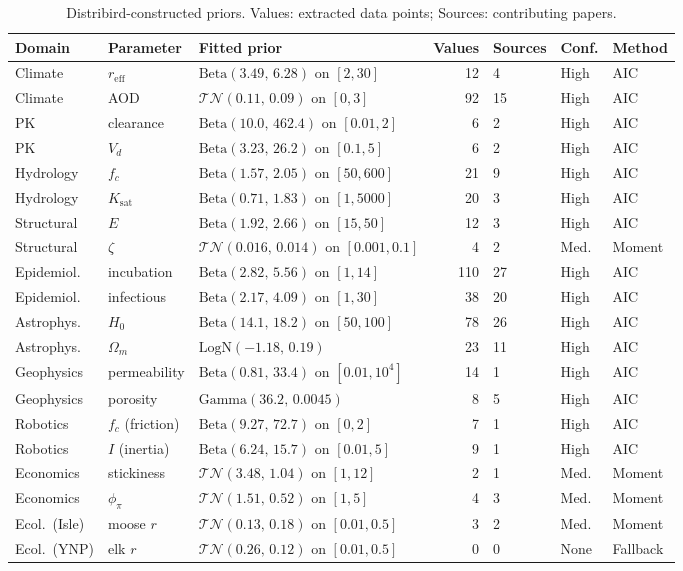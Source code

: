 \documentclass[11pt,a4paper]{article}
\begin{document}
\begin{table}[!htbp]
\centering
\caption{Distribird-constructed priors. Values: extracted data points; Sources: contributing papers.}
\label{tab:priors}
\scriptsize
\setlength{\tabcolsep}{3pt}
\renewcommand{\arraystretch}{0.93}
\begin{tabularx}{\linewidth}{@{}llXrlll@{}}
  \toprule
  \textbf{Domain} & \textbf{Parameter} & \textbf{Fitted prior} & \textbf{Values} & \textbf{Sources} & \textbf{Conf.} & \textbf{Method} \\
  \midrule
  Climate & $r_{\text{eff}}$ & $\mathrm{Beta}(3.49,\,6.28)$ on $[2,30]$ & 12 & 4 & High & AIC \\
  Climate & AOD & $\mathcal{TN}(0.11,\,0.09)$ on $[0,3]$ & 92 & 15 & High & AIC \\
  PK & clearance & $\mathrm{Beta}(10.0,\,462.4)$ on $[0.01,2]$ & 6 & 2 & High & AIC \\
  PK & $V_d$ & $\mathrm{Beta}(3.23,\,26.2)$ on $[0.1,5]$ & 6 & 2 & High & AIC \\
  Hydrology & $f_c$ & $\mathrm{Beta}(1.57,\,2.05)$ on $[50,600]$ & 21 & 9 & High & AIC \\
  Hydrology & $K_{\text{sat}}$ & $\mathrm{Beta}(0.71,\,1.83)$ on $[1,5000]$ & 20 & 3 & High & AIC \\
  Structural & $E$ & $\mathrm{Beta}(1.92,\,2.66)$ on $[15,50]$ & 12 & 3 & High & AIC \\
  Structural & $\zeta$ & $\mathcal{TN}(0.016,\,0.014)$ on $[0.001,0.1]$ & 4 & 2 & Med. & Moment \\
  Epidemiol. & incubation & $\mathrm{Beta}(2.82,\,5.56)$ on $[1,14]$ & 110 & 27 & High & AIC \\
  Epidemiol. & infectious & $\mathrm{Beta}(2.17,\,4.09)$ on $[1,30]$ & 38 & 20 & High & AIC \\
  Astrophys. & $H_0$ & $\mathrm{Beta}(14.1,\,18.2)$ on $[50,100]$ & 78 & 26 & High & AIC \\
  Astrophys. & $\Omega_m$ & $\mathrm{LogN}(-1.18,\,0.19)$ & 23 & 11 & High & AIC \\
  Geophysics & permeability & $\mathrm{Beta}(0.81,\,33.4)$ on $[0.01,10^4]$ & 14 & 1 & High & AIC \\
  Geophysics & porosity & $\mathrm{Gamma}(36.2,\,0.0045)$ & 8 & 5 & High & AIC \\
  Robotics & $f_c$ (friction) & $\mathrm{Beta}(9.27,\,72.7)$ on $[0,2]$ & 7 & 1 & High & AIC \\
  Robotics & $I$ (inertia) & $\mathrm{Beta}(6.24,\,15.7)$ on $[0.01,5]$ & 9 & 1 & High & AIC \\
  Economics & stickiness & $\mathcal{TN}(3.48,\,1.04)$ on $[1,12]$ & 2 & 1 & Med. & Moment \\
  Economics & $\phi_\pi$ & $\mathcal{TN}(1.51,\,0.52)$ on $[1,5]$ & 4 & 3 & Med. & Moment \\
  Ecol.\ (Isle) & moose $r$ & $\mathcal{TN}(0.13,\,0.18)$ on $[0.01,0.5]$ & 3 & 2 & Med. & Moment \\
  Ecol.\ (YNP) & elk $r$ & $\mathcal{TN}(0.26,\,0.12)$ on $[0.01,0.5]$ & 0 & 0 & None & Fallback \\
  \bottomrule
\end{tabularx}
\end{table}
\end{document}
